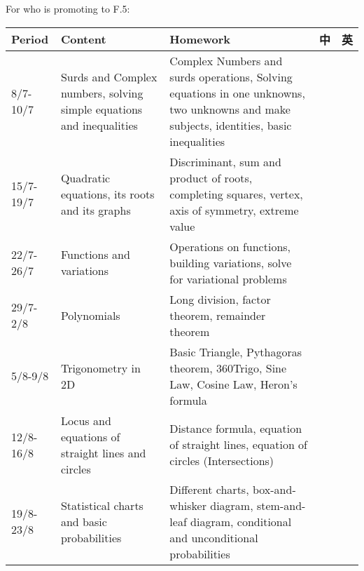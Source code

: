 \documentclass{article}
\begin{document}
    For who is promoting to F.5:
    \begin{center}
        \begin{tabular}{|m{2cm}|m{6cm}|m{6cm}|m{1cm}|m{1cm}|}
            \hline
            Period&Content&Homework&中&英\\
            \hline
            8/7-10/7&Surds and Complex numbers, solving simple equations and inequalities&Complex Numbers and surds operations, Solving equations in one unknowns, two unknowns and make subjects, identities, basic inequalities&&\\
            \hline
            15/7-19/7&Quadratic equations, its roots and its graphs&Discriminant, sum and product of roots, completing squares, vertex, axis of symmetry, extreme value&&\\
            \hline
            22/7-26/7&Functions and variations&Operations on functions, building variations, solve for variational problems&&\\
            \hline
            29/7-2/8&Polynomials&Long division, factor theorem, remainder theorem&&\\
            \hline
            5/8-9/8&Trigonometry in 2D&Basic Triangle, Pythagoras theorem, 360Trigo, Sine Law, Cosine Law, Heron's formula&&\\
            \hline
            12/8-16/8&Locus and equations of straight lines and circles&Distance formula, equation of straight lines, equation of circles (Intersections)&&\\
            \hline
            19/8-23/8&Statistical charts and basic probabilities& Different charts, box-and-whisker diagram, stem-and-leaf diagram, conditional and unconditional probabilities&&\\
            \hline
        \end{tabular}
    \end{center}

    \pagebreak
\end{document}
